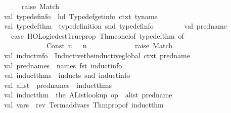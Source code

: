 \begin{isabellebody}
\ \ \ \ \ \ \ \ \ \ {\isacharbar}\ {\isacharunderscore}\ {\isacharequal}{\isachargreater}\ raise\ Match{\isacharparenright}\isanewline
\ \ \ \ \ \ \ \ val\ typedef{\isacharunderscore}info\ {\isacharequal}\ hd\ {\isacharparenleft}Typedef{\isachardot}get{\isacharunderscore}info\ ctxt\ ty{\isacharunderscore}name{\isacharparenright}\isanewline
\ \ \ \ \ \ \ \ val\ typedef{\isacharunderscore}thm\ {\isacharequal}\ {\isacharhash}type{\isacharunderscore}definition\ {\isacharparenleft}snd\ typedef{\isacharunderscore}info{\isacharparenright}\isanewline
\ \ \ \ \ \ \ \ val\ pred{\isacharunderscore}name\ {\isacharequal}\isanewline
\ \ \ \ \ \ \ \ \ \ {\isacharparenleft}case\ HOLogic{\isachardot}dest{\isacharunderscore}Trueprop\ {\isacharparenleft}Thm{\isachardot}concl{\isacharunderscore}of\ typedef{\isacharunderscore}thm{\isacharparenright}\ of\isanewline
\ \ \ \ \ \ \ \ \ \ \ \ {\isacharparenleft}{\isacharunderscore}\ {\isachardollar}\ {\isacharunderscore}\ {\isachardollar}\ {\isacharunderscore}\ {\isachardollar}\ {\isacharparenleft}{\isacharunderscore}\ {\isachardollar}\ Const\ {\isacharparenleft}n{\isacharcomma}\ {\isacharunderscore}{\isacharparenright}{\isacharparenright}{\isacharparenright}\ {\isacharequal}{\isachargreater}\ n\isanewline
\ \ \ \ \ \ \ \ \ \ {\isacharbar}\ {\isacharunderscore}\ {\isacharequal}{\isachargreater}\ raise\ Match{\isacharparenright}\isanewline
\ \ \ \ \ \ \ \ val\ induct{\isacharunderscore}info\ {\isacharequal}\ Inductive{\isachardot}the{\isacharunderscore}inductive{\isacharunderscore}global\ ctxt\ pred{\isacharunderscore}name\isanewline
\ \ \ \ \ \ \ \ val\ pred{\isacharunderscore}names\ {\isacharequal}\ {\isacharhash}names\ {\isacharparenleft}fst\ induct{\isacharunderscore}info{\isacharparenright}\isanewline
\ \ \ \ \ \ \ \ val\ induct{\isacharunderscore}thms\ {\isacharequal}\ {\isacharhash}inducts\ {\isacharparenleft}snd\ induct{\isacharunderscore}info{\isacharparenright}\isanewline
\ \ \ \ \ \ \ \ val\ alist\ {\isacharequal}\ pred{\isacharunderscore}names\ {\isachartilde}{\isachartilde}\ induct{\isacharunderscore}thms\isanewline
\ \ \ \ \ \ \ \ val\ induct{\isacharunderscore}thm\ {\isacharequal}\ the\ {\isacharparenleft}AList{\isachardot}lookup\ {\isacharparenleft}op\ {\isacharequal}{\isacharparenright}\ alist\ pred{\isacharunderscore}name{\isacharparenright}\isanewline
\ \ \ \ \ \ \ \ val\ vars\ {\isacharequal}\ rev\ {\isacharparenleft}Term{\isachardot}add{\isacharunderscore}vars\ {\isacharparenleft}Thm{\isachardot}prop{\isacharunderscore}of\ induct{\isacharunderscore}thm{\isacharparenright}\ {\isacharbrackleft}{\isacharbrackright}{\isacharparenright}\isanewline

\end{isabellebody}
